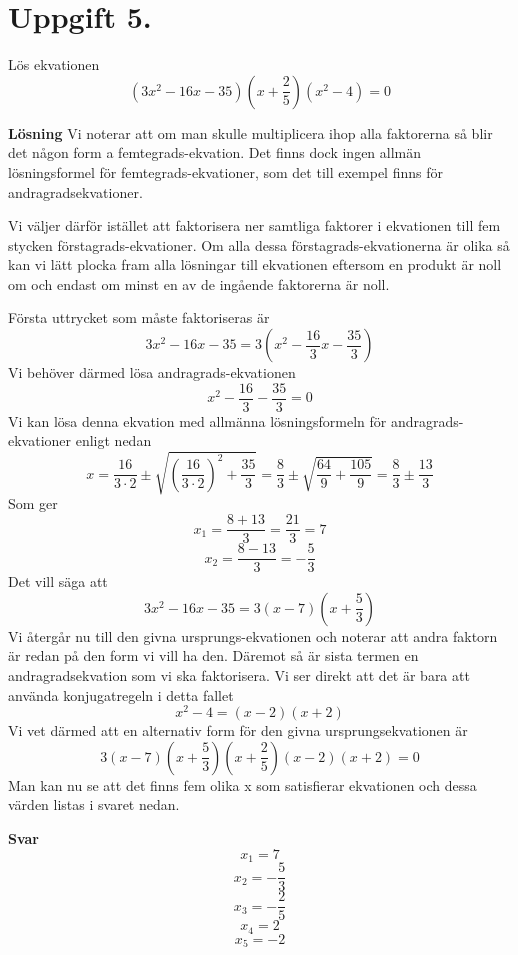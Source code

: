 \documentclass[fleqn]{article}
\begin{document}
\newpage
\section*{Uppgift 5.}

Lös ekvationen
\[
(3x^2 - 16x - 35)(x + \dfrac{2}{5})(x^2-4)=0
\]

\textbf{Lösning}
Vi noterar att om man skulle multiplicera ihop alla faktorerna så blir det någon form a femtegrads-ekvation. Det finns dock ingen allmän lösningsformel för femtegrads-ekvationer, som det till exempel finns för andragradsekvationer.

Vi väljer därför istället att faktorisera ner samtliga faktorer i ekvationen till fem stycken förstagrads-ekvationer. Om alla dessa förstagrads-ekvationerna är olika så kan vi lätt plocka fram alla lösningar till ekvationen eftersom en produkt är noll om och endast om minst en av de ingående faktorerna är noll.

Första uttrycket som måste faktoriseras är 
\[
3x^2 - 16x - 35 = 3(x^2 - \dfrac{16}{3}x - \dfrac{35}{3})
\]
Vi behöver därmed lösa andragrads-ekvationen
\[
x^2 - \dfrac{16}{3} - \dfrac{35}{3} = 0 
\]
Vi kan lösa denna ekvation med allmänna lösningsformeln för andragrads-ekvationer enligt nedan
\[
x = \dfrac{16}{3 \cdot 2} \pm \sqrt{\left(\dfrac{16}{3 \cdot 2}\right) ^2+\dfrac{35}{3}} 
= \dfrac{8}{3} \pm \sqrt{\dfrac{64}{9}+\dfrac{105}{9}}
= \dfrac{8}{3} \pm \dfrac{13}{3}
\]
Som ger
\[
x_1 = \dfrac{8+13}{3} = \dfrac{21}{3} = 7
\]
\[
x_2 = \dfrac{8-13}{3} = -\dfrac{5}{3}
\]
Det vill säga att
\[
3x^2 - 16x - 35 = 3(x - 7)(x + \dfrac{5}{3})
\]
Vi återgår nu till den givna ursprungs-ekvationen och noterar att andra faktorn är redan på den form vi vill ha den. Däremot så är sista termen en andragradsekvation som vi ska faktorisera. Vi ser direkt att det är bara att använda konjugatregeln i detta fallet
\[
x^2 - 4=(x-2)(x+2)
\]
Vi vet därmed att en alternativ form för den givna ursprungsekvationen är
\[
3(x-7)(x + \dfrac{5}{3})(x + \dfrac{2}{5})(x - 2)(x + 2) = 0
\]
Man kan nu se att det finns fem olika x som satisfierar ekvationen och dessa värden listas i svaret nedan.

\textbf{Svar}
\[
x_1 = 7 
\]
\[
x_2 = -\dfrac{5}{3} 
\]
\[
x_3 = -\dfrac{2}{5} 
\]
\[
x_4 = 2
\]
\[
x_5 = -2
\]
\end{document}
